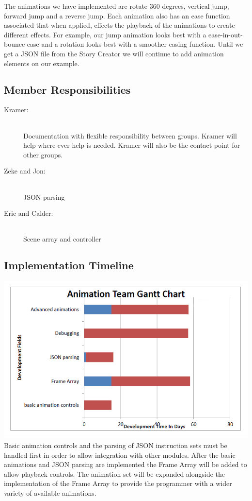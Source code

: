 \documentclass[12pt]{article}
\begin{document}
The animations we have implemented are rotate 360 degrees, vertical jump, forward jump and a reverse jump. Each animation also has an ease function associated that when applied, effects the playback of the animations to create different effects. For example, our jump animation looks best with a ease-in-out-bounce ease and a rotation looks best with a smoother easing function. Until we get a JSON file from the Story Creator we will continue to add animation elements on our example. 
	
\noindent\subsection{Member Responsibilities}


\begin{description}
  \item[Kramer:] \hfill \\
  Documentation with flexible responsibility between groups. Kramer will help where ever help is needed. Kramer will also be the contact point for other groups.
  \item[Zeke and Jon:] \hfill \\
  JSON parsing
  \item[Eric and Calder:] \hfill \\
  Scene array and controller
\end{description}

\noindent\subsection{Implementation Timeline}
\includegraphics[scale=.45]{AnimationGanttChart.png}
\linebreak
\linebreak
Basic animation controls and the parsing of JSON instruction sets must be handled first in order to allow integration with other modules.  After the basic animations and JSON parsing are implemented the Frame Array will be added to allow playback controls.  The animation set will be expanded alongside the implementation of the Frame Array to provide the programmer with a wider variety of available animations.
\end{document}
